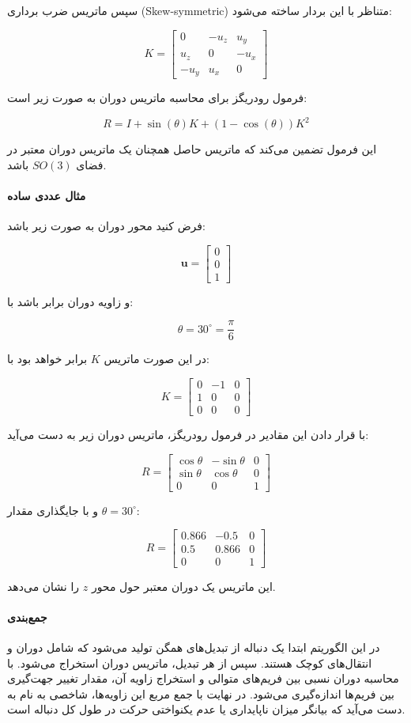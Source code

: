 \documentclass{article}
\begin{document}
سپس ماتریس ضرب برداری (Skew-symmetric) متناظر با این بردار ساخته می‌شود:

\[
K =
\begin{bmatrix}
	0 & -u_z & u_y \\
	u_z & 0 & -u_x \\
	-u_y & u_x & 0
\end{bmatrix}
\]

فرمول رودریگز برای محاسبه ماتریس دوران به صورت زیر است:

\[
R = I + \sin(\theta)K + (1-\cos(\theta))K^2
\]

این فرمول تضمین می‌کند که ماتریس حاصل همچنان یک ماتریس دوران معتبر در فضای \(SO(3)\) باشد.

\paragraph{مثال عددی ساده}

فرض کنید محور دوران به صورت زیر باشد:

\[
\mathbf{u} =
\begin{bmatrix}
	0 \\ 0 \\ 1
\end{bmatrix}
\]

و زاویه دوران برابر باشد با:

\[
\theta = 30^\circ = \frac{\pi}{6}
\]

در این صورت ماتریس \(K\) برابر خواهد بود با:

\[
K =
\begin{bmatrix}
	0 & -1 & 0 \\
	1 & 0 & 0 \\
	0 & 0 & 0
\end{bmatrix}
\]

با قرار دادن این مقادیر در فرمول رودریگز، ماتریس دوران زیر به دست می‌آید:

\[
R =
\begin{bmatrix}
	\cos\theta & -\sin\theta & 0 \\
	\sin\theta & \cos\theta & 0 \\
	0 & 0 & 1
\end{bmatrix}
\]

و با جایگذاری مقدار \(\theta = 30^\circ\):

\[
R =
\begin{bmatrix}
	0.866 & -0.5 & 0 \\
	0.5 & 0.866 & 0 \\
	0 & 0 & 1
\end{bmatrix}
\]

این ماتریس یک دوران معتبر حول محور \(z\) را نشان می‌دهد.

\paragraph{جمع‌بندی}

در این الگوریتم ابتدا یک دنباله از تبدیل‌های همگن تولید می‌شود که شامل دوران و انتقال‌های کوچک هستند. سپس از هر تبدیل، ماتریس دوران استخراج می‌شود. با محاسبه دوران نسبی بین فریم‌های متوالی و استخراج زاویه آن، مقدار تغییر جهت‌گیری بین فریم‌ها اندازه‌گیری می‌شود. در نهایت با جمع مربع این زاویه‌ها، شاخصی به نام  به دست می‌آید که بیانگر میزان ناپایداری یا عدم یکنواختی حرکت در طول کل دنباله است.
\end{document}
